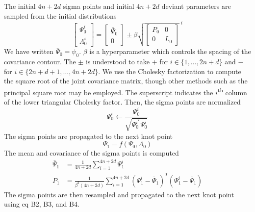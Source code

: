 The initial $4n + 2d$ sigma points and initial $4n + 2d$ deviant parameters are sampled
from the initial distributions
\begin{equation}
  \begin{bmatrix} \Psi_{0}^{i} \\ \Lambda_{0}^{i} \end{bmatrix} =
  \begin{bmatrix} \bar{\Psi}_{0} \\ 0\end{bmatrix}
    \pm \beta \sqrt{\begin{bmatrix} P_{0} & 0\\ 0 & L_{0}\end{bmatrix}}^{\; i}
\end{equation}
We have written $\bar{\Psi}_{0} = \psi_{0}$. $\beta$
is a hyperparameter which controls the spacing of the covariance contour.
The $\pm$ is understood to take $+$ for $ i \in \{1, \dots, 2n + d\}$ and $-$ for
$i \in \{2n + d + 1, \dots, 4n + 2d\}$. We use the Cholesky factorization
to compute the square root of the
joint covariance matrix, though other methods
such as the principal square root may be employed.
The superscript indicates the $i$\textsuperscript{th} column of the
lower triangular Cholesky factor.
Then, the sigma points are normalized
\begin{equation}
  \Psi_{0}^{i} \gets \frac{\Psi_{0}^{i}}{\sqrt{\Psi_{0}^{i^{T}} \Psi_{0}^{i}}}
\end{equation}
The sigma points are propagated to the next knot point
\begin{equation}
  \Psi_{1} = f(\Psi_{0}, \Lambda_{0})
\end{equation}
The mean and covariance of the sigma points is computed
\begin{align}
  \bar{\Psi}_{1} &= \frac{1}{4n + 2d} \sum_{i = 1}^{4n + 2d} \Psi_{1}^{i}\\
  P_{1} &= \frac{1}{\beta^{2}(4n + 2d)} \sum_{i = 1}^{4n + 2d}
  (\Psi^{i}_{1} - \bar{\Psi}_{1})^{T}(\Psi^{i}_{1} - \bar{\Psi}_{1})
\end{align}
The sigma points are then resampled and propagated to the next knot point using eq B2, B3, and B4.




